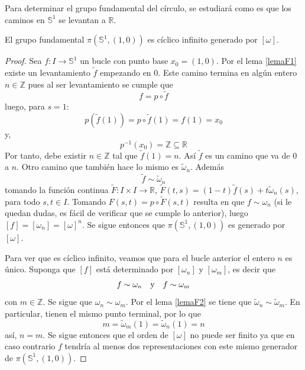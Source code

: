 \documentclass[12pt]{report}
\theoremstyle{largebreak}
\newcommand\cf[3]{\ensuremath{#1:#2\rightarrow#3}}
\begin{document}
    Para determinar el grupo fundamental del círculo, se estudiará como es que los caminos en $\mathbb{S}^1$ se levantan a $\mathbb{R}$.

    \begin{theor}
        El grupo fundamental $\pi(\mathbb{S}^1,(1,0))$ es cíclico infinito generado por $[\omega]$.
    \end{theor}

    \begin{proof}
        Sea $\cf{f}{I}{\mathbb{S}^1}$ un bucle con punto base $x_0=(1,0)$. Por el lema \ref{lemaF1} existe un levantamiento $\widetilde{f}$ empezando en $0$. Este camino termina en algún entero $n\in\mathbb{Z}$ pues al ser levantamiento se cumple que
        \begin{equation*}
            f = p\circ \widetilde{f}
        \end{equation*}
        luego, para $s=1$:
        \begin{equation*}
            p(\widetilde{f}(1))=p\circ\widetilde{f}(1)=f(1)=x_0
        \end{equation*}
        y,
        \begin{equation*}
            p^{-1}(x_0)=\mathbb{Z}\subseteq\mathbb{R}
        \end{equation*}
        Por tanto, debe existir $n\in\mathbb{Z}$ tal que $\widetilde{f}(1)=n$. Así $\widetilde{f}$ es un camino que va de $0$ a $n$. Otro camino que también hace lo mismo es $\widetilde{\omega}_n$. Además
        \begin{equation*}
            \widetilde{f}\sim \widetilde{\omega}_n
        \end{equation*}
        tomando la función continua $\cf{\widetilde{F}}{I\times I}{\mathbb{R}}$, $\widetilde{F}(t,s)=(1-t)\widetilde{f}(s)+t\widetilde{\omega}_n(s)$, para todo $s,t\in I$. Tomando $F(s,t)=p\circ \widetilde{F}(s,t)$ resulta en que $f\sim\omega_n$ (si le quedan dudas, es fácil de verificar que se cumple lo anterior), luego $[f]=[\omega_n]=[\omega]^n$. Se sigue entonces que $\pi(\mathbb{S}^1,(1,0))$ es generado por $[\omega]$.

        Para ver que es cíclico infinito, veamos que para el bucle anterior el entero $n$ es único. Suponga que $[f]$ está determinado por $[\omega_n]$ y $[\omega_m]$, es decir que
        \begin{equation*}
            f\sim\omega_n\quad\textup{y}\quad f\sim\omega_m
        \end{equation*}
        con $m\in\mathbb{Z}$. Se sigue que $\omega_n\sim\omega_m$. Por el lema \ref{lemaF2} se tiene que $\widetilde{\omega}_n\sim\widetilde{\omega}_m$. En particular, tienen el mismo punto terminal, por lo que
        \begin{equation*}
            m=\widetilde{\omega}_m(1)=\widetilde{\omega}_n(1)=n
        \end{equation*}
        así, $n=m$. Se sigue entonces que el orden de $[\omega]$ no puede ser finito ya que en caso contrario $f$ tendría al menos dos representaciones con este mismo generador de $\pi(\mathbb{S}^1,(1,0))$.


\end{proof}
\end{document}
